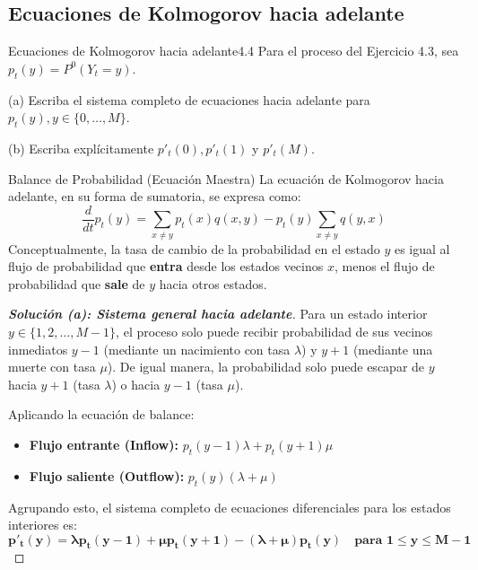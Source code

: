 \documentclass[10pt,a4paper]{article}
\begin{document}
\newpage
\subsection{Ecuaciones de Kolmogorov hacia adelante}

\vspace{5mm}

\begin{ejercicio}{Ecuaciones de Kolmogorov hacia adelante}{4.4}
    Para el proceso del Ejercicio 4.3, sea $p_t(y) = P^0(Y_t = y)$.
    
    (a) Escriba el sistema completo de ecuaciones hacia adelante para $p_t(y), y \in \{0, \dots, M\}$.
    
    (b) Escriba explícitamente $p'_t(0), p'_t(1)$ y $p'_t(M)$.
\end{ejercicio}

\vspace{2mm}

\begin{nota}{Balance de Probabilidad (Ecuación Maestra)}
    La ecuación de Kolmogorov hacia adelante, en su forma de sumatoria, se expresa como:
    \[ \frac{d}{dt} p_t(y) = \sum_{x \neq y} p_t(x)q(x, y) - p_t(y) \sum_{x \neq y} q(y, x) \]
    Conceptualmente, la tasa de cambio de la probabilidad en el estado $y$ es igual al flujo de probabilidad que \textbf{entra} desde los estados vecinos $x$, menos el flujo de probabilidad que \textbf{sale} de $y$ hacia otros estados.
\end{nota}

\begin{proof}[\textbf{Solución (a): Sistema general hacia adelante}]
    Para un estado interior $y \in \{1, 2, \dots, M-1\}$, el proceso solo puede recibir probabilidad de sus vecinos inmediatos $y-1$ (mediante un nacimiento con tasa $\lambda$) y $y+1$ (mediante una muerte con tasa $\mu$). 
    De igual manera, la probabilidad solo puede escapar de $y$ hacia $y+1$ (tasa $\lambda$) o hacia $y-1$ (tasa $\mu$).
    
    Aplicando la ecuación de balance:
    \begin{itemize}
        \item \textbf{Flujo entrante (Inflow):} $p_t(y-1)\lambda + p_t(y+1)\mu$
        \item \textbf{Flujo saliente (Outflow):} $p_t(y)(\lambda + \mu)$
    \end{itemize}
    
    Agrupando esto, el sistema completo de ecuaciones diferenciales para los estados interiores es:
    \[ \mathbf{p'_t(y) = \lambda p_t(y-1) + \mu p_t(y+1) - (\lambda + \mu) p_t(y) \quad \text{para } 1 \le y \le M-1} \]
\end{proof}
\end{document}
